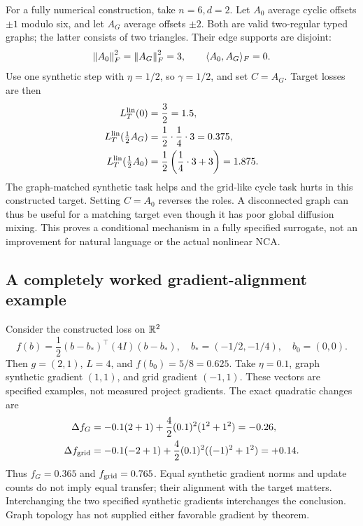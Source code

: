 For a fully numerical construction, take $n=6,d=2$.
Let $A_0$ average cyclic offsets $\pm1$ modulo six, and let $A_G$
average offsets $\pm2$. Both are valid two-regular typed graphs;
the latter consists of two triangles. Their edge supports are disjoint:
\[
 \left\lVert A_0\right\rVert_F^2=\left\lVert A_G\right\rVert_F^2=3,\qquad
 \langle A_0,A_G\rangle_F=0.
 \]
Use one synthetic step with $\eta=1/2$, so $\gamma=1/2$, and set
$C=A_G$. Target losses are then
\begin{align}
 L_T^{\rm lin}(0)&=\frac32=1.5,\\
 L_T^{\rm lin}(\tfrac12 A_G)&=\frac12\cdot\frac14\cdot3
                              =0.375,\\
 L_T^{\rm lin}(\tfrac12 A_0)&=\frac12
                              \left(\frac14\cdot3+3\right)
                              =1.875.
\end{align}
The graph-matched synthetic task helps and the grid-like cycle task
hurts in this constructed target. Setting $C=A_0$ reverses the
roles. A disconnected graph can thus be useful for a matching target
even though it has poor global diffusion mixing.
This proves a conditional mechanism in a fully specified surrogate,
not an improvement for natural language or the actual nonlinear NCA.

\subsection{A completely worked gradient-alignment example}

Consider the constructed loss on $\mathbb{R}^2$
\begin{equation}
 f(b)=\frac12(b-b_*)^\top(4I)(b-b_*),
 \quad b_*=(-1/2,-1/4),\quad b_0=(0,0).
\end{equation}
Then $g=(2,1)$, $L=4$, and $f(b_0)=5/8=0.625$.
Take $\eta=0.1$, graph synthetic gradient $(1,1)$, and grid gradient
$(-1,1)$. These vectors are specified examples, not measured project
gradients. The exact quadratic changes are
\begin{align}
 \Delta f_G&=-0.1(2+1)+
       \frac42(0.1)^2(1^2+1^2)=-0.26,\\
 \Delta f_{\rm grid}&=-0.1(-2+1)+
       \frac42(0.1)^2((-1)^2+1^2)=+0.14.
\end{align}
Thus $f_G=0.365$ and $f_{\rm grid}=0.765$.
Equal synthetic gradient norms and update counts do not imply equal
transfer; their alignment with the target matters. Interchanging the
two specified synthetic gradients interchanges the conclusion. Graph
topology has not supplied either favorable gradient by theorem.

